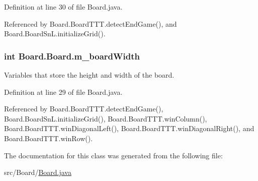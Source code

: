 Definition at line 30 of file Board.\+java.



Referenced by Board.\+Board\+T\+T\+T.\+detect\+End\+Game(), and Board.\+Board\+Sn\+L.\+initialize\+Grid().

\hypertarget{class_board_1_1_board_a811ddc59658729b3cdb0a2db75465334}{}
\subsubsection[{m\+\_\+board\+Width}]{\setlength{\rightskip}{0pt plus 5cm}int Board.\+Board.\+m\+\_\+board\+Width\hspace{0.3cm}{\ttfamily [protected]}}\label{class_board_1_1_board_a811ddc59658729b3cdb0a2db75465334}
Variables that store the height and width of the board. 

Definition at line 29 of file Board.\+java.



Referenced by Board.\+Board\+T\+T\+T.\+detect\+End\+Game(), Board.\+Board\+Sn\+L.\+initialize\+Grid(), Board.\+Board\+T\+T\+T.\+win\+Column(), Board.\+Board\+T\+T\+T.\+win\+Diagonal\+Left(), Board.\+Board\+T\+T\+T.\+win\+Diagonal\+Right(), and Board.\+Board\+T\+T\+T.\+win\+Row().



The documentation for this class was generated from the following file\+:\begin{DoxyCompactItemize}
\item 
src/\+Board/\hyperlink{_board_8java}{Board.\+java}\end{DoxyCompactItemize}
